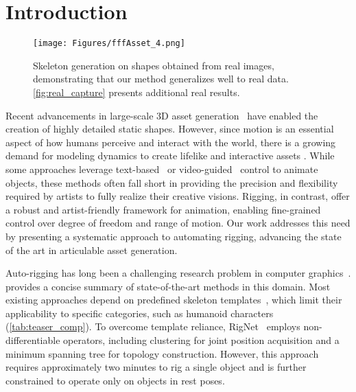 \section{Introduction}

\begin{figure*}[t]
\texttt{[image: Figures/fffAsset\_4.png]}
\caption{Skeleton generation on shapes obtained from real images, demonstrating that our method generalizes well to real data. \cref{fig:real_capture} presents additional real results.}
\vspace{-5mm}
\label{fig:real_teaser}
\end{figure*}

Recent advancements in large-scale 3D asset generation~\cite{hong2023lrm, li2023instant3d,xu2023dmv3d,jun2023shap, shi2023mvdream,nichol2022point,liu2023zero,liu2024one} have enabled the creation of highly detailed static shapes. 
% 
However, since motion is an essential aspect of how humans perceive and interact with the world, there is a growing demand for modeling dynamics to create lifelike and interactive assets \cite{liu2024dynamic}.
% 
While some approaches leverage text-based~\cite{bahmani20244d, zhao2023animate124,singer2023text} or video-guided~\cite{yin20234dgen,ren2023dreamgaussian4d} control to animate objects, these methods often fall short in providing the precision and flexibility required by artists to fully realize their creative visions.
Rigging, in contrast, offer a robust and artist-friendly framework for animation, enabling fine-grained control over degree of freedom and range of motion. Our work addresses this need by presenting a systematic approach to automating rigging, advancing the state of the art in articulable asset generation. 

Auto-rigging has long been a challenging research problem in computer graphics~\cite{pinocchio, rignet, guo2024makeitani, chu2024humanrig, li2021learning}.  provides a concise summary of state-of-the-art methods in this domain.
Most existing approaches depend on predefined skeleton templates~\cite{pinocchio, guo2024makeitani, chu2024humanrig, li2021learning}, which limit their applicability to specific categories, such as humanoid characters (\cref{tab:teaser_comp}).
To overcome template reliance, RigNet~\cite{rignet} employs non-differentiable operators, including clustering for joint position acquisition and a minimum spanning tree for topology construction. However, this approach requires approximately two minutes to rig a single object and is further constrained to operate only on objects in rest poses.


